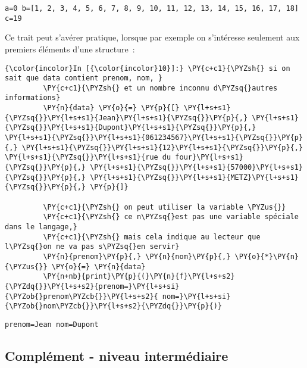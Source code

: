     \begin{Verbatim}[commandchars=\\\{\},frame=single,framerule=0.3mm,rulecolor=\color{cellframecolor}]
a=0 b=[1, 2, 3, 4, 5, 6, 7, 8, 9, 10, 11, 12, 13, 14, 15, 16, 17, 18] c=19
\end{Verbatim}

    Ce trait peut s'avérer pratique, lorsque par exemple on s'intéresse
seulement aux premiers éléments d'une structure~:

    \begin{Verbatim}[commandchars=\\\{\},frame=single,framerule=0.3mm,rulecolor=\color{cellframecolor}]
{\color{incolor}In [{\color{incolor}10}]:} \PY{c+c1}{\PYZsh{} si on sait que data contient prenom, nom, }
         \PY{c+c1}{\PYZsh{} et un nombre inconnu d\PYZsq{}autres informations}
         \PY{n}{data} \PY{o}{=} \PY{p}{[} \PY{l+s+s1}{\PYZsq{}}\PY{l+s+s1}{Jean}\PY{l+s+s1}{\PYZsq{}}\PY{p}{,} \PY{l+s+s1}{\PYZsq{}}\PY{l+s+s1}{Dupont}\PY{l+s+s1}{\PYZsq{}}\PY{p}{,} \PY{l+s+s1}{\PYZsq{}}\PY{l+s+s1}{061234567}\PY{l+s+s1}{\PYZsq{}}\PY{p}{,} \PY{l+s+s1}{\PYZsq{}}\PY{l+s+s1}{12}\PY{l+s+s1}{\PYZsq{}}\PY{p}{,} \PY{l+s+s1}{\PYZsq{}}\PY{l+s+s1}{rue du four}\PY{l+s+s1}{\PYZsq{}}\PY{p}{,} \PY{l+s+s1}{\PYZsq{}}\PY{l+s+s1}{57000}\PY{l+s+s1}{\PYZsq{}}\PY{p}{,} \PY{l+s+s1}{\PYZsq{}}\PY{l+s+s1}{METZ}\PY{l+s+s1}{\PYZsq{}}\PY{p}{,} \PY{p}{]}
         
         \PY{c+c1}{\PYZsh{} on peut utiliser la variable \PYZus{}}
         \PY{c+c1}{\PYZsh{} ce n\PYZsq{}est pas une variable spéciale dans le langage,}
         \PY{c+c1}{\PYZsh{} mais cela indique au lecteur que l\PYZsq{}on ne va pas s\PYZsq{}en servir}
         \PY{n}{prenom}\PY{p}{,} \PY{n}{nom}\PY{p}{,} \PY{o}{*}\PY{n}{\PYZus{}} \PY{o}{=} \PY{n}{data}
         \PY{n+nb}{print}\PY{p}{(}\PY{n}{f}\PY{l+s+s2}{\PYZdq{}}\PY{l+s+s2}{prenom=}\PY{l+s+si}{\PYZob{}prenom\PYZcb{}}\PY{l+s+s2}{ nom=}\PY{l+s+si}{\PYZob{}nom\PYZcb{}}\PY{l+s+s2}{\PYZdq{}}\PY{p}{)}
\end{Verbatim}


    \begin{Verbatim}[commandchars=\\\{\},frame=single,framerule=0.3mm,rulecolor=\color{cellframecolor}]
prenom=Jean nom=Dupont
\end{Verbatim}

    \hypertarget{compluxe9ment---niveau-intermuxe9diaire}{%
\subsection{Complément - niveau
intermédiaire}\label{compluxe9ment---niveau-intermuxe9diaire}}


